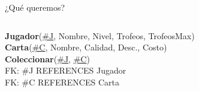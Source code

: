 \begin{frame}{¿Qu\'e queremos?}
\begin{columns}[T]
\begin{column}{0.48\linewidth}
\begin{scriptsize}
                    \textbf{Jugador}(\underline{\#J}, Nombre, Nivel, Trofeos, TrofeosMax)\\[2mm]
                    \textbf{Carta}(\underline{\#C}, Nombre, Calidad, Desc., Costo)\\[2mm]
                    \textbf{Coleccionar}(\underline{\#J}, \underline{\#C})\\[1mm]
                    \hspace{4mm} FK: \#J REFERENCES Jugador\\
                    \hspace{4mm} FK: \#C REFERENCES Carta

                \end{scriptsize}

        \end{column}
        
    \end{columns}

\end{frame}
